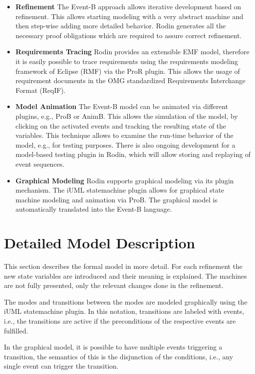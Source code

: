 \documentclass{template/openetcs_article}
\begin{document}
\begin{itemize}
\item {\bf Refinement} The Event-B approach allows iterative development based
  on refinement. This allows starting modeling with a very abstract machine and
  then step-wise adding more detailed behavior. Rodin generates all the
  necessary proof obligations which are required to assure correct refinement.
\item {\bf Requirements Tracing} Rodin provides an extensible EMF model,
  therefore it is easily possible to trace requirements using the requirements
  modeling framework of Eclipse (RMF) via the ProR plugin. This allows the usage
  of requirement documents in the OMG standardized Requirements Interchange
  Format (ReqIF).
\item {\bf Model Animation} The Event-B model can be animated via different
  plugins, e.g., ProB or AnimB. This allows the simulation of the model, by
  clicking on the activated events and tracking the resulting state of the
  variables. This technique allows to examine the run-time behavior of the
  model, e.g., for testing purposes. There is also ongoing development for a
  model-based testing plugin in Rodin, which will allow storing and replaying of
  event sequences.
\item {\bf Graphical Modeling} Rodin supports graphical modeling via its plugin
  mechanism. The iUML statemachine plugin allows for graphical state machine
  modeling and animation via ProB. The graphical model is automatically
  translated into the Event-B language.
\end{itemize}

\section{Detailed Model Description}
\label{sec:deta-model-descr}

This section describes the formal model in more detail. For each refinement the
new state variables are introduced and their meaning is explained. The machines
are not fully presented, only the relevant changes done in the refinement.

The modes and transitions between  the modes are modeled graphically using the
iUML statemachine plugin. In this notation, transitions are labeled with events,
i.e., the transitions are active if the preconditions of the respective events
are fulfilled.

In the graphical model, it is possible to have multiple events triggering a
transition, the semantics of this is the disjunction of the conditions, i.e.,
any single event can trigger the transition.
\end{document}
